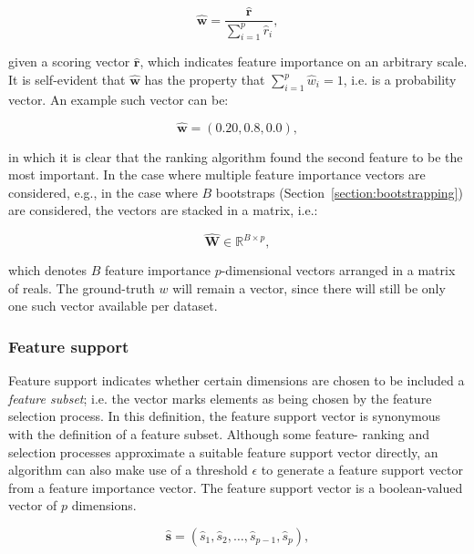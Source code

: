 \documentclass[../main.tex]{subfiles}
\begin{document}
\begin{equation}\label{eq:normalize-feature-ranking}
\hat{\boldsymbol{w}} = \frac{\hat{\boldsymbol{r}}}{\sum^p_{i=1} \hat{r}_i},
\end{equation}

given a scoring vector $\hat{\boldsymbol{r}}$, which indicates feature importance on an arbitrary scale. It is self-evident that $\hat{\boldsymbol{w}}$ has the property that $\sum^p_{i=1} \hat{w}_i = 1$, i.e. is a probability vector. An example such vector can be:

\begin{equation}\label{eq:importance-vector-example}
\hat{\boldsymbol{w}} = (0.20, 0.8, 0.0),
\end{equation}

in which it is clear that the ranking algorithm found the second feature to be the most important. In the case where multiple feature importance vectors are considered, e.g., in the case where $B$ bootstraps (Section~\ref{section:bootstrapping}) are considered, the vectors are stacked in a matrix, i.e.:

\begin{equation}\label{eq:feature-importance-matrix}
\mathbf{\hat{W}} \in \mathbb{R}^{B \times p},
\end{equation}

which denotes $B$ feature importance $p$-dimensional vectors arranged in a matrix of reals. The ground-truth $w$ will remain a vector, since there will still be only one such vector available per dataset.



\subsubsection{Feature support}\label{section:feature-support-definition}
Feature support indicates whether certain dimensions are chosen to be included a \textit{feature subset}; i.e. the vector marks elements as being chosen by the feature selection process. In this definition, the feature support vector is synonymous with the definition of a feature subset. Although some feature- ranking and selection processes approximate a suitable feature support vector directly, an algorithm can also make use of a threshold $\epsilon$ to generate a feature support vector from a feature importance vector. The feature support vector is a boolean-valued vector of $p$ dimensions.

\begin{equation}
\hat{\boldsymbol{s}} = (\hat{s}_1, \hat{s}_2, \ldots, \hat{s}_{p-1}, \hat{s}_p),
\end{equation}
\end{document}
